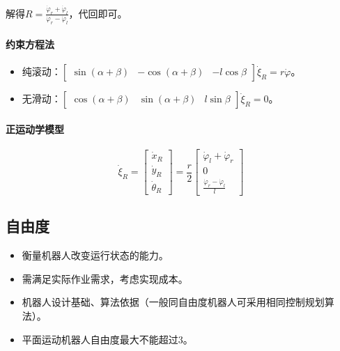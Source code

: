 \documentclass[
12pt, %
a4paper, 
oneside, %
headinclude,footinclude, %
]{scrartcl}
\begin{document}
解得$ R = \frac{\dot{\varphi}_r + \dot{\varphi}_l}{\dot{\varphi}_r - \dot{\varphi}_l} $，代回即可。
\paragraph{约束方程法}
\begin{itemize}
\item 纯滚动：$ \begin{bmatrix} \sin(\alpha + \beta) & -\cos(\alpha + \beta) & -l \cos\beta \end{bmatrix} \dot{\xi}_R = r\dot{\varphi} $。
\item 无滑动：$ \begin{bmatrix} \cos(\alpha + \beta) & \sin(\alpha + \beta) & l \sin\beta \end{bmatrix} \dot{\xi}_R = 0 $。
\end{itemize}
\paragraph{正运动学模型}
$$ \dot{\xi}_R = \begin{bmatrix} \dot{x}_R \\ \dot{y}_R \\ \dot{\theta}_R \end{bmatrix} = \frac{r}{2} \begin{bmatrix} \dot{\varphi}_l + \dot{\varphi}_r \\ 0 \\ \frac{\dot{\varphi}_r - \dot{\varphi}_l}{l} \end{bmatrix} $$
\subsection[自由度]{自由度}
\begin{itemize}
\item 衡量机器人改变运行状态的能力。
\item 需满足实际作业需求，考虑实现成本。
\item 机器人设计基础、算法依据（一般同自由度机器人可采用相同控制规划算法）。
\item 平面运动机器人自由度最大不能超过$ 3 $。
\end{itemize}
\end{document}

